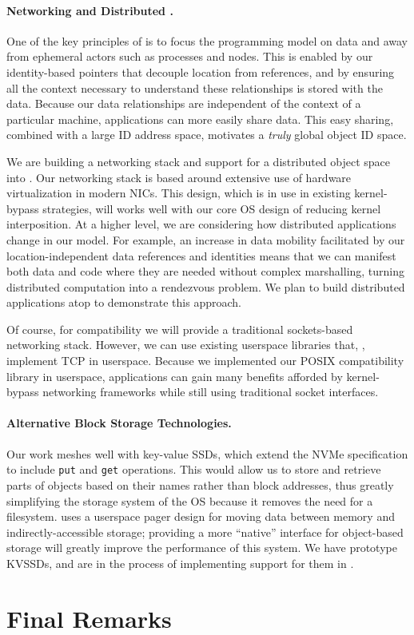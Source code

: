 {    \paragraph{Networking and Distributed \Twizzler.}

    One of the key principles of \Twizzler is to focus the programming model on data and away from
    ephemeral actors such as processes and nodes. This is enabled by our identity-based pointers that
    decouple location from references,
    and by ensuring all the context
    necessary to understand these relationships is stored with the data. Because our data relationships
    are independent of the context of a particular machine, applications can more easily share data.
    This easy sharing, combined with a large ID address space, motivates a \emph{truly} global object ID
    space.

    We are building a networking stack and support for a distributed object space into \Twizzler. Our
    networking stack is based around extensive use of hardware virtualization in modern NICs. This
    design, which is in use in existing kernel-bypass strategies, will works well with our core OS design
    of reducing kernel interposition. At a higher level, we are
    considering how distributed applications change in our model. For example, an increase in data
    mobility facilitated by our location-independent data references and identities
    means that we can manifest both data and code where they are needed without complex marshalling, turning
    distributed computation into a rendezvous problem. We plan to build distributed applications atop
    \Twizzler to demonstrate this approach.

    Of course, for compatibility we will provide a traditional sockets-based networking stack. However,
    we can use existing userspace libraries that, \eg, implement TCP in userspace.
    Because we implemented our POSIX compatibility library in userspace, applications can gain many
    benefits afforded by kernel-bypass networking frameworks while still using traditional socket
    interfaces.


    \paragraph{Alternative Block Storage Technologies.}

    Our work meshes well with key-value SSDs, which extend the NVMe
    specification to include \texttt{put} and \texttt{get} operations. This would allow us to store and
    retrieve parts of objects based on their names rather than block addresses, thus greatly
    simplifying the storage system of the OS because it removes the need for a filesystem. \Twizzler
    uses a userspace pager design for moving data between memory and indirectly-accessible storage;
    providing a more ``native'' interface for object-based storage will greatly improve the performance
    of this system. We have prototype KVSSDs, and are in the process of implementing support for them in
    \Twizzler.

}


\section{Final Remarks}

